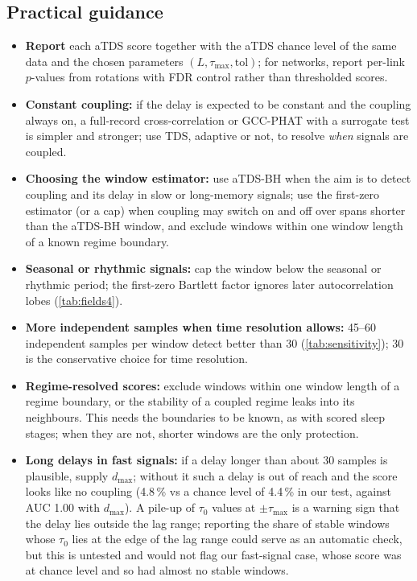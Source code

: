\documentclass[11pt,a4paper]{article}
\begin{document}
\subsection*{Practical guidance}
\label{sec:guidance}
\begin{itemize}
\item \textbf{Report} each aTDS score together with the aTDS chance level of the same data and the chosen parameters $(L, \tau_{\max}, \mathrm{tol})$; for networks, report per-link $p$-values from rotations with FDR control rather than thresholded scores.
\item \textbf{Constant coupling:} if the delay is expected to be constant and the coupling always on, a full-record cross-correlation or GCC-PHAT with a surrogate test is simpler and stronger; use TDS, adaptive or not, to resolve \emph{when} signals are coupled.
\item \textbf{Choosing the window estimator:} use aTDS-BH when the aim is to detect coupling and its delay in slow or long-memory signals; use the first-zero estimator (or a cap) when coupling may switch on and off over spans shorter than the aTDS-BH window, and exclude windows within one window length of a known regime boundary.
\item \textbf{Seasonal or rhythmic signals:} cap the window below the seasonal or rhythmic period; the first-zero Bartlett factor ignores later autocorrelation lobes (\cref{tab:fields4}).
\item \textbf{More independent samples when time resolution allows:} 45--60 independent samples per window detect better than 30 (\cref{tab:sensitivity}); 30 is the conservative choice for time resolution.
\item \textbf{Regime-resolved scores:} exclude windows within one window length of a regime boundary, or the stability of a coupled regime leaks into its neighbours. This needs the boundaries to be known, as with scored sleep stages; when they are not, shorter windows are the only protection.
\item \textbf{Long delays in fast signals:} if a delay longer than about 30 samples is plausible, supply $d_{\max}$; without it such a delay is out of reach and the score looks like no coupling (4.8\,\% vs a chance level of 4.4\,\% in our test, against AUC 1.00 with $d_{\max}$). A pile-up of $\tau_0$ values at $\pm\tau_{\max}$ is a warning sign that the delay lies outside the lag range; reporting the share of stable windows whose $\tau_0$ lies at the edge of the lag range could serve as an automatic check, but this is untested and would not flag our fast-signal case, whose score was at chance level and so had almost no stable windows.

\end{itemize}
\end{document}
